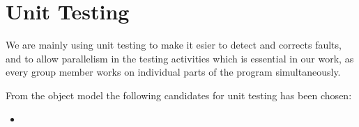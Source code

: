 \section{Unit Testing}
We are mainly using unit testing to make it esier to detect and corrects faults, and to allow parallelism in the testing activities which is essential in our work, as every group member works on individual parts of the program simultaneously.

From the object model the following candidates for unit testing has been chosen:
\begin{itemize}
	\item 
\end{itemize}